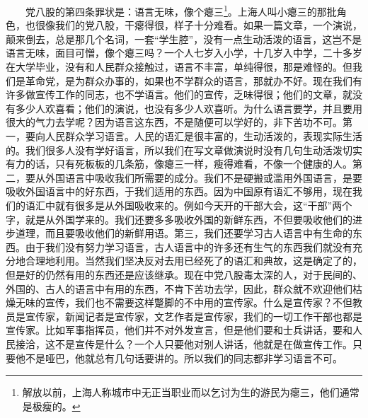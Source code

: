 \documentclass[cn,11pt,chinese]{elegantbook}
\begin{document}
　　党八股的第四条罪状是：语言无味，像个瘪三\footnote[8]{ 解放以前，上海人称城市中无正当职业而以乞讨为生的游民为瘪三，他们通常是极瘦的。}。上海人叫小瘪三的那批角色，也很像我们的党八股，干瘪得很，样子十分难看。如果一篇文章，一个演说，颠来倒去，总是那几个名词，一套“学生腔”，没有一点生动活泼的语言，这岂不是语言无味，面目可憎，像个瘪三吗？一个人七岁入小学，十几岁入中学，二十多岁在大学毕业，没有和人民群众接触过，语言不丰富，单纯得很，那是难怪的。但我们是革命党，是为群众办事的，如果也不学群众的语言，那就办不好。现在我们有许多做宣传工作的同志，也不学语言。他们的宣传，乏味得很；他们的文章，就没有多少人欢喜看；他们的演说，也没有多少人欢喜听。为什么语言要学，并且要用很大的气力去学呢？因为语言这东西，不是随便可以学好的，非下苦功不可。第一，要向人民群众学习语言。人民的语汇是很丰富的，生动活泼的，表现实际生活的。我们很多人没有学好语言，所以我们在写文章做演说时没有几句生动活泼切实有力的话，只有死板板的几条筋，像瘪三一样，瘦得难看，不像一个健康的人。第二，要从外国语言中吸收我们所需要的成分。我们不是硬搬或滥用外国语言，是要吸收外国语言中的好东西，于我们适用的东西。因为中国原有语汇不够用，现在我们的语汇中就有很多是从外国吸收来的。例如今天开的干部大会，这“干部”两个字，就是从外国学来的。我们还要多多吸收外国的新鲜东西，不但要吸收他们的进步道理，而且要吸收他们的新鲜用语。第三，我们还要学习古人语言中有生命的东西。由于我们没有努力学习语言，古人语言中的许多还有生气的东西我们就没有充分地合理地利用。当然我们坚决反对去用已经死了的语汇和典故，这是确定了的，但是好的仍然有用的东西还是应该继承。现在中党八股毒太深的人，对于民间的、外国的、古人的语言中有用的东西，不肯下苦功去学，因此，群众就不欢迎他们枯燥无味的宣传，我们也不需要这样蹩脚的不中用的宣传家。什么是宣传家？不但教员是宣传家，新闻记者是宣传家，文艺作者是宣传家，我们的一切工作干部也都是宣传家。比如军事指挥员，他们并不对外发宣言，但是他们要和士兵讲话，要和人民接洽，这不是宣传是什么？一个人只要他对别人讲话，他就是在做宣传工作。只要他不是哑巴，他就总有几句话要讲的。所以我们的同志都非学习语言不可。\\
\end{document}
